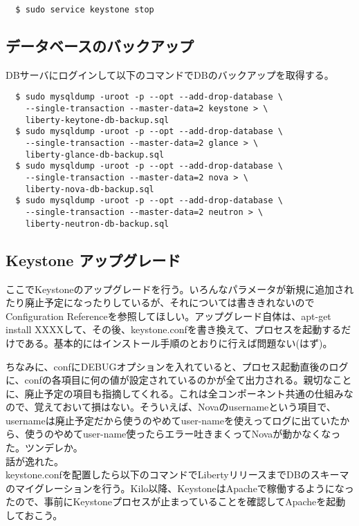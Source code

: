 \documentclass[9pt,b5paper,tombo,openany]{jsbook}
\begin{document}
\begin{lstlisting}
  $ sudo service keystone stop
\end{lstlisting}

\subsection{データベースのバックアップ}
\noindent
DBサーバにログインして以下のコマンドでDBのバックアップを取得する。

\begin{lstlisting}
  $ sudo mysqldump -uroot -p --opt --add-drop-database \
    --single-transaction --master-data=2 keystone > \
    liberty-keytone-db-backup.sql
  $ sudo mysqldump -uroot -p --opt --add-drop-database \
    --single-transaction --master-data=2 glance > \
    liberty-glance-db-backup.sql
  $ sudo mysqldump -uroot -p --opt --add-drop-database \
    --single-transaction --master-data=2 nova > \
    liberty-nova-db-backup.sql
  $ sudo mysqldump -uroot -p --opt --add-drop-database \
    --single-transaction --master-data=2 neutron > \
    liberty-neutron-db-backup.sql
\end{lstlisting}

\subsection{Keystone アップグレード}
ここでKeystoneのアップグレードを行う。いろんなパラメータが新規に追加されたり廃止予定になったりしているが、それについては書ききれないのでConfiguration Referenceを参照してほしい。アップグレード自体は、apt-get install XXXXして、その後、keystone.confを書き換えて、プロセスを起動するだけである。基本的にはインストール手順のとおりに行えば問題ない(はず)。

ちなみに、confにDEBUGオプションを入れていると、プロセス起動直後のログに、confの各項目に何の値が設定されているのかが全て出力される。親切なことに、廃止予定の項目も指摘してくれる。これは全コンポーネント共通の仕組みなので、覚えておいて損はない。そういえば、Novaのusernameという項目で、usernameは廃止予定だから使うのやめてuser-nameを使えってログに出ていたから、使うのやめてuser-name使ったらエラー吐きまくってNovaが動かなくなった。ツンデレか。\\[1ex]

話が逸れた。\\[1ex]


keystone.confを配置したら以下のコマンドでLibertyリリースまでDBのスキーマのマイグレーションを行う。Kilo以降、KeystoneはApacheで稼働するようになったので、事前にKeystoneプロセスが止まっていることを確認してApacheを起動しておこう。
\end{document}
